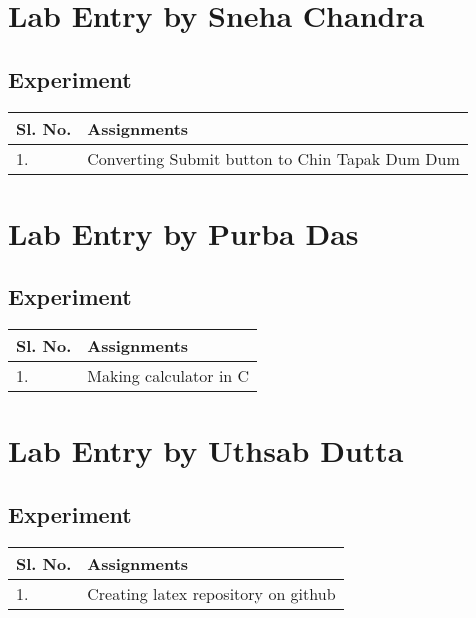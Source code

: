 \documentclass[a4paper,12pt]{article}
\begin{document}
\section{Lab Entry by Sneha Chandra}
\subsection{Experiment}
\vspace{0.5cm}
\begin{table}[ht]
\centering
\begin{tabular}{|p{50pt}|p{200pt}|}
\hline
\textbf{Sl. No.} & \textbf{Assignments} \\ \hline
1. & Converting Submit button to Chin Tapak Dum Dum \\ \hline
\end{tabular}
\end{table}
\section{Lab Entry by Purba Das}
\subsection{Experiment}
\vspace{0.5cm}
\begin{table}[ht]
\centering
\begin{tabular}{|p{50pt}|p{200pt}|}
\hline
\textbf{Sl. No.} & \textbf{Assignments} \\ \hline
1. & Making calculator in C  \\ \hline
\end{tabular}
\end{table}
\newpage
\usetikzlibrary{calc}
\section{Lab Entry by Uthsab Dutta}
\subsection{Experiment}
\vspace{0.5cm}
\begin{table}[ht]
\centering
\begin{tabular}{|p{50pt}|p{200pt}|}
\hline
\textbf{Sl. No.} & \textbf{Assignments} \\ \hline
1. & Creating latex repository on github \\ \hline
\end{tabular}
\end{table}
\vspace{2.5cm}
\end{document}
